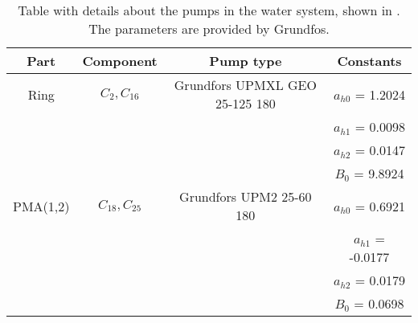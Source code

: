\begin{table}[]
\centering
\begin{tabular}{c|c|c|c}
Part 	 & Component    		  & Pump type 					 	& Constants 	    \\ \hline
Ring     & $C_2,C_{16}$ 		  & Grundfors UPMXL GEO 25-125 180  & $a_{h0}$ = 1.2024 \\
		 &				 		  &								 	& $a_{h1}$ = 0.0098 \\
		 &						  &								 	& $a_{h2}$ = 0.0147 \\
		 &						  &								 	& $B_{0}$ = 9.8924  \\ \hline 
PMA(1,2) & $C_{18},C_{25}$ & Grundfors UPM2 25-60 180	    & $a_{h0}$ = 0.6921 \\
		 &				 		  &								 	& $a_{h1}$ = -0.0177\\
		 &						  &								 	& $a_{h2}$ = 0.0179 \\
		 &						  &								 	& $B_{0}$ = 0.0698  
\end{tabular}
\caption{Table with details about the pumps in the water system, shown in . The parameters are provided by Grundfos.}
\label{tab:pump_detail}
\end{table}
